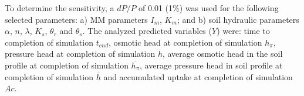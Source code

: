 To determine the sensitivity, a $dP/P$ of 0.01 (1\%) was used for the following selected parameters: 
a) MM parameters $I_m$, $K_m$; and  
b) soil hydraulic parameters $\alpha$, $n$, $\lambda$, $K_s$, $\theta_r$ and $\theta_s$.
The analyzed predicted variables ($Y$) were: time to completion of simulation $t_{end}$, osmotic head at completion of simulation $h_{\pi}$, pressure head at completion of simulation $h$, average osmotic head in the soil profile at completion of simulation $\overline{h_{\pi}}$, average pressure head in soil profile at completion of simulation $\overline{h}$ and accumulated uptake at completion of simulation $Ac$.
%
%
%
%
%
%
%
